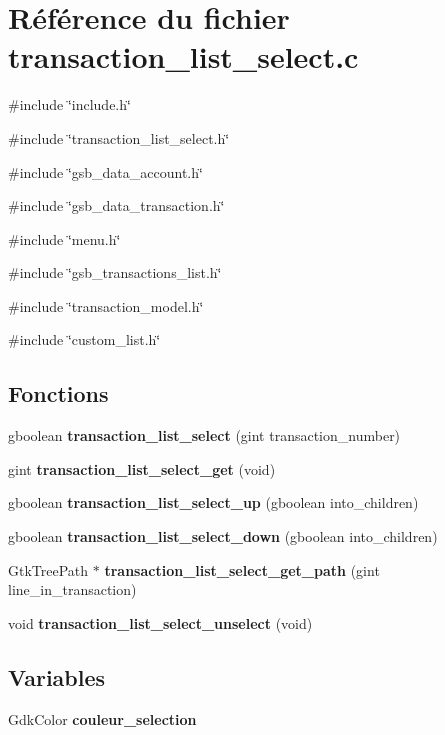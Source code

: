 \section{Référence du fichier transaction\_\-list\_\-select.c}
\label{transaction__list__select_8c}
{\ttfamily \#include \char`\"{}include.h\char`\"{}}\par
{\ttfamily \#include \char`\"{}transaction\_\-list\_\-select.h\char`\"{}}\par
{\ttfamily \#include \char`\"{}gsb\_\-data\_\-account.h\char`\"{}}\par
{\ttfamily \#include \char`\"{}gsb\_\-data\_\-transaction.h\char`\"{}}\par
{\ttfamily \#include \char`\"{}menu.h\char`\"{}}\par
{\ttfamily \#include \char`\"{}gsb\_\-transactions\_\-list.h\char`\"{}}\par
{\ttfamily \#include \char`\"{}transaction\_\-model.h\char`\"{}}\par
{\ttfamily \#include \char`\"{}custom\_\-list.h\char`\"{}}\par
\subsection*{Fonctions}
\begin{DoxyCompactItemize}
\item 
gboolean {\bf transaction\_\-list\_\-select} (gint transaction\_\-number)
\item 
gint {\bf transaction\_\-list\_\-select\_\-get} (void)
\item 
gboolean {\bf transaction\_\-list\_\-select\_\-up} (gboolean into\_\-children)
\item 
gboolean {\bf transaction\_\-list\_\-select\_\-down} (gboolean into\_\-children)
\item 
GtkTreePath $\ast$ {\bf transaction\_\-list\_\-select\_\-get\_\-path} (gint line\_\-in\_\-transaction)
\item 
void {\bf transaction\_\-list\_\-select\_\-unselect} (void)
\end{DoxyCompactItemize}
\subsection*{Variables}
\begin{DoxyCompactItemize}
\item 
GdkColor {\bf couleur\_\-selection}
\end{DoxyCompactItemize}


